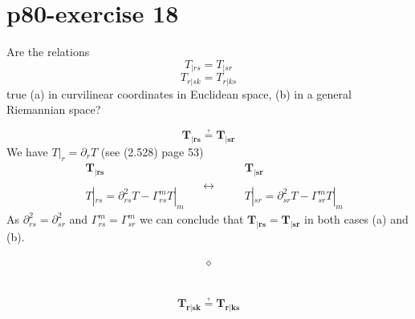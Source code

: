 \section{p80-exercise 18}
\begin{tcolorbox}
Are the relations $$T_{|rs} =T_{|sr} $$ $$T_{r|sk} =T_{r|ks} $$ true (a) in curvilinear coordinates in Euclidean space, (b) in a general Riemannian space?
\end{tcolorbox}
$$\boldsymbol{T_{|rs} \questeq  T_{|sr}}$$
We have $T|_r = \partial_rT$ (see (2.528) page 53) \\
\begin{equation}
  \begin{split}
  \ & \boldsymbol{T_{|rs}}\\\\
   \ & T|_{rs} = \partial^2_{rs}T - \Gamma^m_{rs}T|_m
  \end{split}
\quad\leftrightarrow\quad
  \begin{split}
 \ & \boldsymbol{T_{|sr}}\\\\
   \ & T|_{sr} = \partial^2_{sr}T - \Gamma^m_{sr}T|_m
  \end{split}
\end{equation}
As $\partial^2_{rs} =\partial^2_{sr}$ and $\Gamma^m_{rs} =\Gamma^m_{sr}$ we can conclude that $\boldsymbol{T_{|rs} =T_{|sr}}$ in both cases (a) and (b).\\\\
$$\boldsymbol{\diamond}$$\\\\
$$\boldsymbol{T_{r|sk} \questeq  T_{r|ks}}$$
